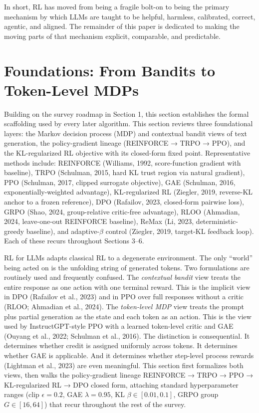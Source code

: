 In short, RL has moved from being a fragile bolt-on to being the primary mechanism by which LLMs are taught to be helpful, harmless, calibrated, correct, agentic, and aligned. The remainder of this paper is dedicated to making the moving parts of that mechanism explicit, comparable, and predictable.

\section{Foundations: From Bandits to Token-Level MDPs}\label{foundations-from-bandits-to-token-level-mdps}

Building on the survey roadmap in Section 1, this section establishes the formal scaffolding used by every later algorithm. This section reviews three foundational layers: the Markov decision process (MDP) and contextual bandit views of text generation, the policy-gradient lineage (REINFORCE → TRPO → PPO), and the KL-regularized RL objective with its closed-form fixed point. Representative methods include: REINFORCE (Williams, 1992, score-function gradient with baseline), TRPO (Schulman, 2015, hard KL trust region via natural gradient), PPO (Schulman, 2017, clipped surrogate objective), GAE (Schulman, 2016, exponentially-weighted advantage), KL-regularized RL (Ziegler, 2019, reverse-KL anchor to a frozen reference), DPO (Rafailov, 2023, closed-form pairwise loss), GRPO (Shao, 2024, group-relative critic-free advantage), RLOO (Ahmadian, 2024, leave-one-out REINFORCE baseline), ReMax (Li, 2023, deterministic-greedy baseline), and adaptive-\(\beta\) control (Ziegler, 2019, target-KL feedback loop). Each of these recurs throughout Sections 3--6.

RL for LLMs adapts classical RL to a degenerate environment. The only ``world'' being acted on is the unfolding string of generated tokens. Two formulations are routinely used and frequently confused. The \emph{contextual bandit} view treats the entire response as one action with one terminal reward. This is the implicit view in DPO (Rafailov et al., 2023) and in PPO over full responses without a critic (RLOO; Ahmadian et al., 2024). The \emph{token-level MDP} view treats the prompt plus partial generation as the state and each token as an action. This is the view used by InstructGPT-style PPO with a learned token-level critic and GAE (Ouyang et al., 2022; Schulman et al., 2016). The distinction is consequential. It determines whether credit is assigned uniformly across tokens. It determines whether GAE is applicable. And it determines whether step-level process rewards (Lightman et al., 2023) are even meaningful. This section first formalizes both views, then walks the policy-gradient lineage REINFORCE → TRPO → PPO → KL-regularized RL → DPO closed form, attaching standard hyperparameter ranges (clip \(\epsilon = 0.2\), GAE \(\lambda = 0.95\), KL \(\beta \in [0.01, 0.1]\), GRPO group \(G \in [16, 64]\)) that recur throughout the rest of the survey.

